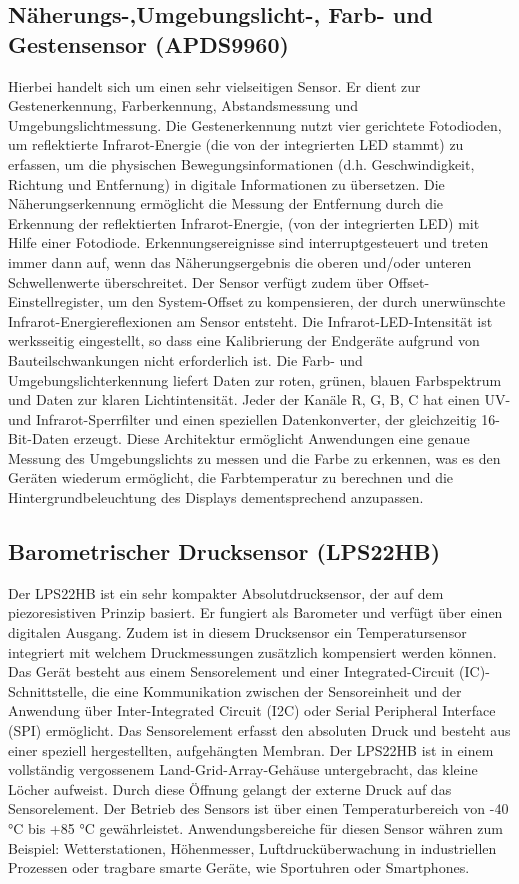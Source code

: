 \subsection{Näherungs-,Umgebungslicht-, Farb- und Gestensensor (APDS9960)}
	Hierbei handelt sich um einen sehr vielseitigen Sensor. Er dient zur Gestenerkennung, Farberkennung, Abstandsmessung und Umgebungslichtmessung. Die Gestenerkennung nutzt vier gerichtete Fotodioden, um reflektierte Infrarot-Energie (die von der integrierten LED stammt) zu erfassen, um die physischen Bewegungsinformationen (d.h. Geschwindigkeit, Richtung und Entfernung) in digitale Informationen zu übersetzen. Die Näherungserkennung ermöglicht die Messung der Entfernung durch die Erkennung der reflektierten Infrarot-Energie, (von der integrierten LED) mit Hilfe einer Fotodiode. Erkennungsereignisse sind interruptgesteuert und treten immer dann auf, wenn das Näherungsergebnis die oberen und/oder unteren Schwellenwerte überschreitet. Der Sensor verfügt zudem über Offset-Einstellregister, um den System-Offset zu kompensieren, der durch unerwünschte Infrarot-Energiereflexionen am Sensor entsteht. Die Infrarot-LED-Intensität ist werksseitig eingestellt, so dass eine Kalibrierung der Endgeräte aufgrund von Bauteilschwankungen nicht erforderlich ist. Die Farb- und Umgebungslichterkennung liefert Daten zur roten, grünen, blauen Farbspektrum und Daten zur klaren Lichtintensität. Jeder der Kanäle R, G, B, C hat einen UV- und Infrarot-Sperrfilter und einen speziellen Datenkonverter, der gleichzeitig 16-Bit-Daten erzeugt. Diese Architektur ermöglicht Anwendungen eine genaue Messung des Umgebungslichts zu messen und die Farbe zu erkennen, was es den Geräten wiederum ermöglicht, die Farbtemperatur zu berechnen und die Hintergrundbeleuchtung des Displays dementsprechend anzupassen.\cite{AT.2015}\cite{Ard.2024}
	
\subsection{Barometrischer Drucksensor (LPS22HB)}
	Der LPS22HB ist ein sehr kompakter Absolutdrucksensor, der auf dem piezoresistiven Prinzip basiert. Er fungiert als Barometer und verfügt über einen digitalen Ausgang. Zudem ist in diesem Drucksensor ein Temperatursensor integriert mit welchem Druckmessungen zusätzlich kompensiert werden können. Das Gerät besteht aus einem Sensorelement und einer Integrated-Circuit (IC)-Schnittstelle, die eine Kommunikation zwischen der Sensoreinheit und der Anwendung über Inter-Integrated Circuit (I2C) oder Serial Peripheral Interface (SPI) ermöglicht. Das Sensorelement erfasst den absoluten Druck und besteht aus einer speziell hergestellten, aufgehängten Membran. Der LPS22HB ist in einem vollständig vergossenem Land-Grid-Array-Gehäuse untergebracht, das kleine Löcher aufweist. Durch diese Öffnung gelangt der externe Druck auf das Sensorelement. Der Betrieb des Sensors ist über einen Temperaturbereich von -40 °C bis +85 °C gewährleistet. \cite{STM2.2017}\cite{Ard.2024}
	Anwendungsbereiche für diesen Sensor währen zum Beispiel: Wetterstationen, Höhenmesser, Luftdrucküberwachung in industriellen Prozessen oder tragbare smarte Geräte, wie Sportuhren oder Smartphones.
	
